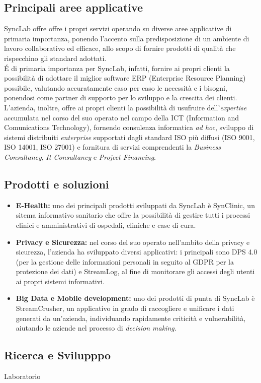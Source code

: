 \subsection{Principali aree applicative}
SyncLab offre offre i propri servizi operando su diverse aree applicative di primaria importanza, ponendo l'accento sulla predisposizione di un ambiente di lavoro collaborativo ed efficace, allo scopo di fornire prodotti di qualità che rispecchino gli standard adottati.\\
\'E di primaria importanza per SyncLab, infatti, fornire ai propri clienti la possibilità di adottare il miglior software \gls{ERP} (Enterprise Resource Planning) possibile, valutando accuratamente caso per caso le necessità e i bisogni, ponendosi come partner di supporto per lo sviluppo e la crescita dei clienti.\\
L'azienda, inoltre, offre ai propri clienti la possibilità di usufruire dell'\textit{expertise} accumulata nel corso del suo operato nel campo della \gls{ICT} (Information and Comunications Technology), fornendo consulenza informatica \textit{ad hoc}, sviluppo di sistemi distribuiti \textit{enterprise} supportati dagli standard ISO più diffusi (ISO 9001, ISO 14001, ISO 27001) e fornitura di servizi comprendenti la \textit{Business Consultancy}, \textit{It Consultancy} e \textit{Project Financing}.


\subsection{Prodotti e soluzioni}
\begin{itemize}
	\item \textbf{E-Health:} uno  dei principali prodotti sviluppati da SyncLab è SynClinic, un sitema informativo sanitario che offre la possibilità di gestire tutti i processi clinici e amministrativi di ospedali, cliniche e case di cura.
	\item \textbf{Privacy e Sicurezza:} nel corso del suo operato nell'ambito della privacy e sicurezza, l'azienda ha sviluppato diversi applicativi: i principali sono DPS 4.0 (per la gestione delle informazioni personali in seguito al GDPR per la protezione dei dati) e StreamLog, al fine di monitorare gli accessi degli utenti ai propri sistemi informativi.
	\item \textbf{Big Data e Mobile development:} uno dei prodotti di punta di SyncLab è StreamCrusher, un applicativo in grado di raccogliere e unificare i dati generati da un'azienda, individuando rapidamente criticità e vulnerabilità, aiutando le aziende nel processo di \textit{decision making}.
\end{itemize}

\subsection{Ricerca e Svilupppo}
Laboratorio
